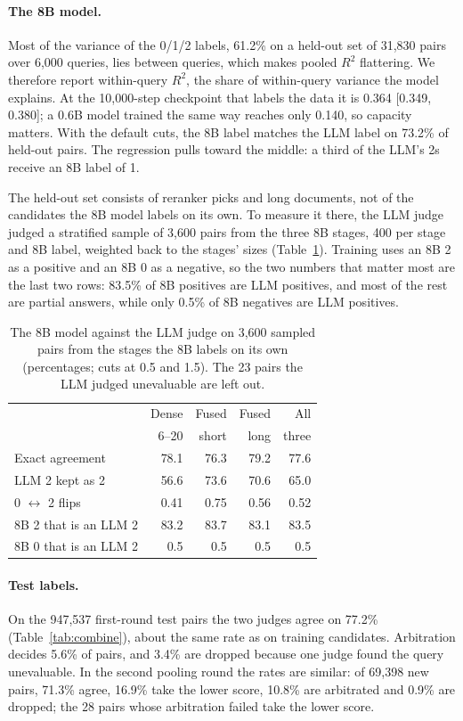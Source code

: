 \paragraph{The 8B model.}
Most of the variance of the 0/1/2 labels, 61.2\% on a held-out set of 31,830 pairs over 6,000 queries, lies between queries, which makes pooled $R^2$ flattering. We therefore report within-query $R^2$, the share of within-query variance the model explains. At the 10,000-step checkpoint that labels the data it is 0.364 [0.349, 0.380]; a 0.6B model trained the same way reaches only 0.140, so capacity matters. With the default cuts, the 8B label matches the LLM label on 73.2\% of held-out pairs. The regression pulls toward the middle: a third of the LLM's 2s receive an 8B label of 1.

The held-out set consists of reranker picks and long documents, not of the candidates the 8B model labels on its own. To measure it there, the LLM judge judged a stratified sample of 3,600 pairs from the three 8B stages, 400 per stage and 8B label, weighted back to the stages' sizes (Table~\ref{tab:8b}). Training uses an 8B 2 as a positive and an 8B 0 as a negative, so the two numbers that matter most are the last two rows: 83.5\% of 8B positives are LLM positives, and most of the rest are partial answers, while only 0.5\% of 8B negatives are LLM positives.

\begin{table}[t]
\centering
\small
\setlength{\tabcolsep}{4pt}
\begin{tabular}{lrrrr}
\toprule
 & Dense & Fused & Fused & All \\
 & 6--20 & short & long & three \\
\midrule
Exact agreement & 78.1 & 76.3 & 79.2 & 77.6 \\
LLM 2 kept as 2 & 56.6 & 73.6 & 70.6 & 65.0 \\
0 $\leftrightarrow$ 2 flips & 0.41 & 0.75 & 0.56 & 0.52 \\
8B 2 that is an LLM 2 & 83.2 & 83.7 & 83.1 & 83.5 \\
8B 0 that is an LLM 2 & 0.5 & 0.5 & 0.5 & 0.5 \\
\bottomrule
\end{tabular}
\caption{The 8B model against the LLM judge on 3,600 sampled pairs from the stages the 8B labels on its own (percentages; cuts at 0.5 and 1.5). The 23 pairs the LLM judged unevaluable are left out.}
\label{tab:8b}
\end{table}

\paragraph{Test labels.}
On the 947,537 first-round test pairs the two judges agree on 77.2\% (Table~\ref{tab:combine}), about the same rate as on training candidates. Arbitration decides 5.6\% of pairs, and 3.4\% are dropped because one judge found the query unevaluable. In the second pooling round the rates are similar: of 69,398 new pairs, 71.3\% agree, 16.9\% take the lower score, 10.8\% are arbitrated and 0.9\% are dropped; the 28 pairs whose arbitration failed take the lower score.
